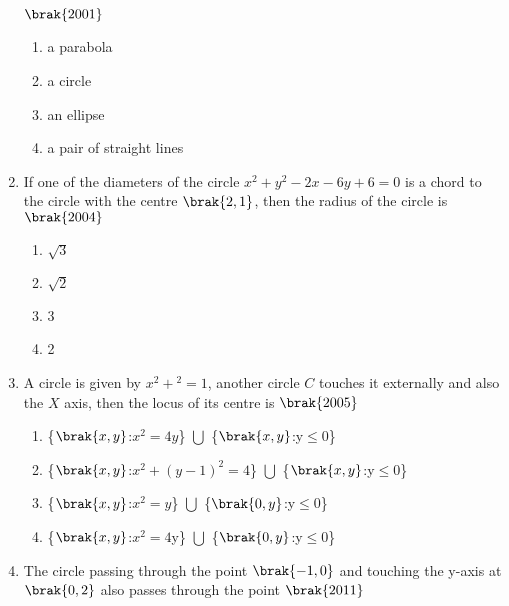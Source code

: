 \begin{enumerate}[label=\thesubsection.\arabic*.,ref=\thesubsection.\theenumi]
        \hfill$\brak{2001}$
        \begin{multicols}{2}
\begin{enumerate}
        \item a parabola
        \item a circle
        \item an ellipse
        \item a pair of straight lines
        \end{enumerate}
        \end{multicols}
     \item If one of the diameters of the circle $x^2+y^2-2x-6y+6=0$ is a chord to the circle with the centre $\brak{2, 1}$, then the radius of the circle is 
         \hfill$\brak{2004}$
         \begin{multicols}{2}
     \begin{multicols}{4}
\begin{enumerate}
         \item $\sqrt3$
         \item $\sqrt2$
         \item 3
         \item 2
     \end{enumerate}
\end{multicols}
     \end{multicols}
     \item A circle is given by $x^2+$$^2=1$,  another circle $C$ touches it externally and also the $X$ axis,  then the locus of its centre is
         \hfill$\brak{2005}$
     \begin{multicols}{2}
\begin{enumerate}
         \item \{$\brak{x, y}$:$x^2=4y$\} $\bigcup$ \{$\brak{x, y}$:y$\le$0\}
         \item \{$\brak{x, y}$:$x^2+(y-1)^2=4$\} $\bigcup$ \{$\brak{x, y}$:y$\le$0\}
         \item \{$\brak{x, y}$:$x^2=y$\} $\bigcup$ \{$\brak{0, y}$:y$\le$0\}
         \item \{$\brak{x, y}$:$x^2=4$y\} $\bigcup$ \{$\brak{0, y}$:y$\le$0\}
         \end{enumerate}
         \end{multicols}
             \item The circle passing through the point $\brak{-1, 0}$ and touching the y-axis at $\brak{0, 2}$ also passes through the point
                 \hfill$\brak{2011}$
             \begin{multicols}{4}

\end{multicols}
\end{enumerate}
